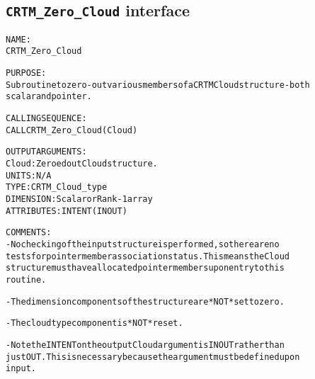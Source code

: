 \subsection{\texttt{CRTM\_Zero\_Cloud} interface}
  \label{sec:CRTM_Zero_Cloud_interface}
  \begin{alltt}
 
  NAME:
        CRTM_Zero_Cloud
  
  PURPOSE:
        Subroutine to zero-out various members of a CRTM Cloud structure - both
        scalar and pointer.
 
  CALLING SEQUENCE:
        CALL CRTM_Zero_Cloud( Cloud )
 
  OUTPUT ARGUMENTS:
        Cloud:        Zeroed out Cloud structure.
                      UNITS:      N/A
                      TYPE:       CRTM_Cloud_type
                      DIMENSION:  Scalar or Rank-1 array
                      ATTRIBUTES: INTENT(IN OUT)
 
  COMMENTS:
        - No checking of the input structure is performed, so there are no
          tests for pointer member association status. This means the Cloud
          structure must have allocated pointer members upon entry to this
          routine.
 
        - The dimension components of the structure are *NOT* set to zero.
 
        - The cloud type component is *NOT* reset.
 
        - Note the INTENT on the output Cloud argument is IN OUT rather than
          just OUT. This is necessary because the argument must be defined upon
          input.
 
  \end{alltt}
